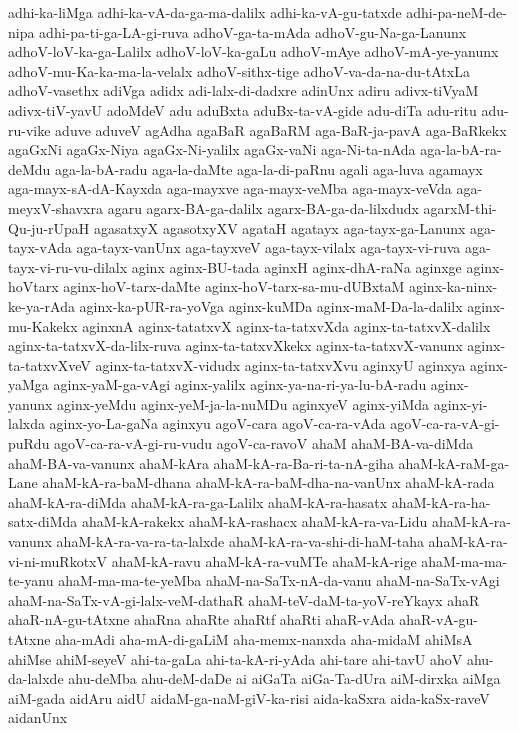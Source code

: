{adhi-ka-liMga
adhi-ka-vA-da-ga-ma-dalilx
adhi-ka-vA-gu-tatxde
adhi-pa-neM-de-nipa
adhi-pa-ti-ga-LA-gi-ruva
adhoV-ga-ta-mAda
adhoV-gu-Na-ga-Lanunx
adhoV-loV-ka-ga-Lalilx
adhoV-loV-ka-gaLu
adhoV-mAye
adhoV-mA-ye-yanunx
adhoV-mu-Ka-ka-ma-la-velalx
adhoV-sithx-tige
adhoV-va-da-na-du-tAtxLa
adhoV-vasethx
adiVga
adidx
adi-lalx-di-dadxre
adinUnx
adiru
adivx-tiVyaM
adivx-tiV-yavU
adoMdeV
adu
aduBxta
aduBx-ta-vA-gide
adu-diTa
adu-ritu
adu-ru-vike
aduve
aduveV
agAdha
agaBaR
agaBaRM
aga-BaR-ja-pavA
aga-BaRkekx
agaGxNi
agaGx-Niya
agaGx-Ni-yalilx
agaGx-vaNi
aga-Ni-ta-nAda
aga-la-bA-ra-deMdu
aga-la-bA-radu
aga-la-daMte
aga-la-di-paRnu
agali
aga-luva
agamayx
aga-mayx-sA-dA-Kayxda
aga-mayxve
aga-mayx-veMba
aga-mayx-veVda
aga-meyxV-shavxra
agaru
agarx-BA-ga-dalilx
agarx-BA-ga-da-lilxdudx
agarxM-thi-Qu-ju-rUpaH
agasatxyX
agasotxyXV
agataH
agatayx
aga-tayx-ga-Lanunx
aga-tayx-vAda
aga-tayx-vanUnx
aga-tayxveV
aga-tayx-vilalx
aga-tayx-vi-ruva
aga-tayx-vi-ru-vu-dilalx
aginx
aginx-BU-tada
aginxH
aginx-dhA-raNa
aginxge
aginx-hoVtarx
aginx-hoV-tarx-daMte
aginx-hoV-tarx-sa-mu-dUBxtaM
aginx-ka-ninx-ke-ya-rAda
aginx-ka-pUR-ra-yoVga
aginx-kuMDa
aginx-maM-Da-la-dalilx
aginx-mu-Kakekx
aginxnA
aginx-tatatxvX
aginx-ta-tatxvXda
aginx-ta-tatxvX-dalilx
aginx-ta-tatxvX-da-lilx-ruva
aginx-ta-tatxvXkekx
aginx-ta-tatxvX-vanunx
aginx-ta-tatxvXveV
aginx-ta-tatxvX-vidudx
aginx-ta-tatxvXvu
aginxyU
aginxya
aginx-yaMga
aginx-yaM-ga-vAgi
aginx-yalilx
aginx-ya-na-ri-ya-lu-bA-radu
aginx-yanunx
aginx-yeMdu
aginx-yeM-ja-la-nuMDu
aginxyeV
aginx-yiMda
aginx-yi-lalxda
aginx-yo-La-gaNa
aginxyu
agoV-cara
agoV-ca-ra-vAda
agoV-ca-ra-vA-gi-puRdu
agoV-ca-ra-vA-gi-ru-vudu
agoV-ca-ravoV
ahaM
ahaM-BA-va-diMda
ahaM-BA-va-vanunx
ahaM-kAra
ahaM-kA-ra-Ba-ri-ta-nA-giha
ahaM-kA-raM-ga-Lane
ahaM-kA-ra-baM-dhana
ahaM-kA-ra-baM-dha-na-vanUnx
ahaM-kA-rada
ahaM-kA-ra-diMda
ahaM-kA-ra-ga-Lalilx
ahaM-kA-ra-hasatx
ahaM-kA-ra-ha-satx-diMda
ahaM-kA-rakekx
ahaM-kA-rashacx
ahaM-kA-ra-va-Lidu
ahaM-kA-ra-vanunx
ahaM-kA-ra-va-ra-ta-lalxde
ahaM-kA-ra-va-shi-di-haM-taha
ahaM-kA-ra-vi-ni-muRkotxV
ahaM-kA-ravu
ahaM-kA-ra-vuMTe
ahaM-kA-rige
ahaM-ma-ma-te-yanu
ahaM-ma-ma-te-yeMba
ahaM-na-SaTx-nA-da-vanu
ahaM-na-SaTx-vAgi
ahaM-na-SaTx-vA-gi-lalx-veM-dathaR
ahaM-teV-daM-ta-yoV-reYkayx
ahaR
ahaR-nA-gu-tAtxne
ahaRna
ahaRte
ahaRtf
ahaRti
ahaR-vAda
ahaR-vA-gu-tAtxne
aha-mAdi
aha-mA-di-gaLiM
aha-memx-nanxda
aha-midaM
ahiMsA
ahiMse
ahiM-seyeV
ahi-ta-gaLa
ahi-ta-kA-ri-yAda
ahi-tare
ahi-tavU
ahoV
ahu-da-lalxde
ahu-deMba
ahu-deM-daDe
ai
aiGaTa
aiGa-Ta-dUra
aiM-dirxka
aiMga
aiM-gada
aidAru
aidU
aidaM-ga-naM-giV-ka-risi
aida-kaSxra
aida-kaSx-raveV
aidanUnx
}
